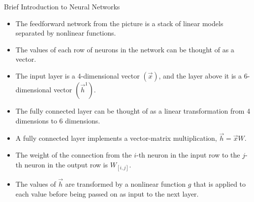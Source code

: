 \documentclass[handout]{beamer}
\begin{document}
\begin{frame}{Brief Introduction to Neural Networks}
\begin{scriptsize}
\begin{itemize}
\item The feedforward network from the picture is a stack of linear models separated by nonlinear functions.
\item The values of each row of neurons in the network can be thought of as a vector. 

\item The input layer is a 4-dimensional vector $(\vec{x})$, and the layer above it is a 6-dimensional vector $(\vec{h}^1)$.
\item The fully connected layer can be thought of as a linear transformation from 4 dimensions to 6 dimensions. 
\item A fully connected layer implements a vector-matrix multiplication, $\vec{h}=\vec{x}W$.
\item The weight of the connection from the $i$-th neuron in the input row to the $j$-th neuron in the output row is $W_{[i,j]}$.
\item The values of $\vec{h}$ are transformed by a nonlinear function $g$ that is applied to each value before being passed on as input to the next layer.

\end{itemize}


\end{scriptsize}
\end{frame}
\end{document}
